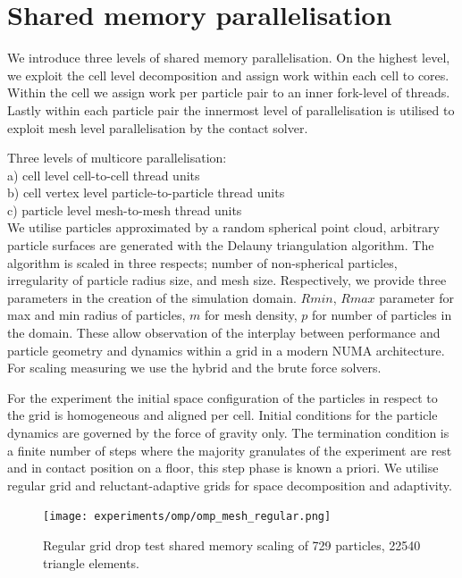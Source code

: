 \section{Shared memory parallelisation}
\label{section:shared-memory}

We introduce three levels of shared memory parallelisation. On the highest level, we exploit the cell level decomposition and assign work within each cell to cores. Within the cell we assign work per particle pair  to an inner fork-level of threads. Lastly within each particle pair the innermost level of parallelisation is utilised to exploit mesh level parallelisation by the contact solver.

Three levels of multicore parallelisation:\\

a) cell level cell-to-cell thread units\\

b) cell vertex level particle-to-particle thread units\\

c) particle level mesh-to-mesh thread units\\

We utilise particles approximated by a random spherical point cloud, arbitrary particle surfaces are generated with the Delauny triangulation algorithm. The algorithm is scaled in three respects; number of non-spherical particles, irregularity of particle radius size, and mesh size. Respectively, we provide three parameters in the creation of the simulation domain. $Rmin$, $Rmax$ parameter for max and min radius of particles, $m$ for mesh density, $p$ for number of particles in the domain. These allow observation of the interplay between performance and particle geometry and dynamics within a grid in a modern NUMA architecture. For scaling measuring we use the hybrid and the brute force solvers.

For the experiment the initial space configuration of the particles in respect to the grid is homogeneous and aligned per cell. Initial conditions for the particle dynamics are governed by the force of gravity only. The termination condition is a finite number of steps where the majority granulates of the experiment are rest and in contact position on a floor, this step phase is known a priori. We utilise regular grid and reluctant-adaptive grids for space decomposition and adaptivity. 

\begin{figure}[htb]
  \begin{center}
    \texttt{[image: experiments/omp/omp\_mesh\_regular.png]}
  \end{center}
  \caption{Regular grid drop test shared memory scaling of 729 particles, 22540 triangle elements.}
  \label{figure:omp_regular_triangle_20}
\end{figure}

